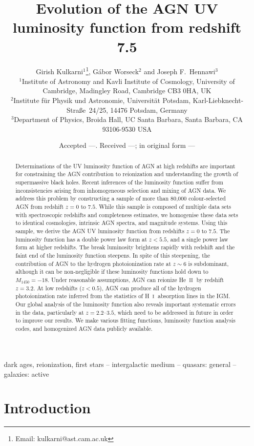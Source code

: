 \documentclass[fleqn,usenatbib]{mnras}
\title[AGN luminosity function]{Evolution of the AGN UV
  luminosity function from redshift 7.5}
\author[Kulkarni et al.]
       {{Girish Kulkarni$^{1}$\thanks{Email: kulkarni@ast.cam.ac.uk},
           G\'abor Worseck$^{2}$
           and Joseph F.~Hennawi$^{3}$} \\
         $^1$Institute of Astronomy and Kavli Institute of Cosmology,
         University of Cambridge, Madingley Road, Cambridge CB3 0HA,
         UK \\
         $^2$Institute f\"ur Physik und Astronomie, Universit\"at
         Potsdam, Karl-Liebknecht-Stra\ss e\ 24/25, 14476 Potsdam,
         Germany \\
         $^3$Department of Physics, Broida Hall, UC Santa Barbara,
         Santa Barbara, CA 93106-9530 USA}
\date{Accepted ---. Received ---; in original form ---}
\def\HI{\hbox{H~$\scriptstyle\rm I$}}
\def\HeII{\hbox{He~$\scriptstyle\rm II$}}
\begin{document}
\label{firstpage}
\pagerange{\pageref{firstpage}--\pageref{lastpage}}
\maketitle

\begin{abstract}
  Determinations of the UV luminosity function of AGN at high
  redshifts are important for constraining the AGN contribution to
  reionization and understanding the growth of supermassive black
  holes.  Recent inferences of the luminosity function suffer from
  inconsistencies arising from inhomogeneous selection and mixing of
  AGN data.  We address this problem by constructing a sample of more
  than 80,000 colour-selected AGN from redshift $z=0$ to $7.5$.  While
  this sample is composed of multiple data sets with spectroscopic
  redshifts and completeness estimates, we homogenise these data sets
  to identical cosmologies, intrinsic AGN spectra, and magnitude
  systems.  Using this sample, we derive the AGN UV luminosity
  function from redshifts $z=0$ to $7.5$.  The luminosity function has
  a double power law form at $z<5.5$, and a single power law form at
  higher redshifts.  The break luminosity brightens rapidly with
  redshift and the faint end of the luminosity function steepens.  In
  spite of this steepening, the contribution of AGN to the hydrogen
  photoionization rate at $z\sim 6$ is subdominant, although it can be
  non-negligible if these luminosity functions hold down to
  $M_{1450}=-18$.  Under reasonable assumptions, AGN can reionize
  \HeII\ by redshift $z=3.2$.  At low redshifts ($z<0.5$), AGN can
  produce all of the hydrogen photoionization rate inferred from the
  statistics of \HI\ absorption lines in the IGM.  Our global analysis
  of the luminosity function also reveals important systematic errors
  in the data, particularly at $z=2.2$--$3.5$, which need to be
  addressed in future in order to improve our results.  We make
  various fitting functions, luminosity function analysis codes, and
  homogenized AGN data publicly available.
\end{abstract}

\begin{keywords}
  dark ages, reionization, first stars -- intergalactic medium --
  quasars: general -- galaxies: active
\end{keywords}

\section{Introduction}
\end{document}
